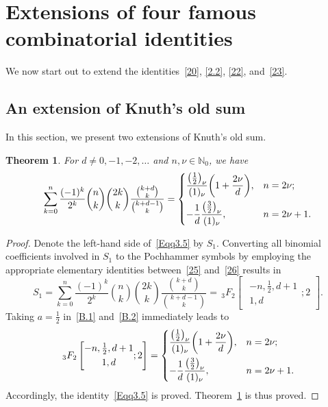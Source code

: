 \documentclass[reqno]{amsart}
\numberwithin{equation}{section}
\theoremstyle{plain}
\newtheorem{thm}{Theorem}[section]
\theoremstyle{remark}
\begin{document}
\section{Extensions of four famous combinatorial identities}\label{sec-four}
We now start out to extend the identities~\eqref{20}, \eqref{2.2}, \eqref{22}, and~\eqref{23}.

\subsection{An extension of Knuth's old sum}\label{sec3}

In this section, we present two extensions of Knuth's old sum.

\begin{thm}\label{thm1}
For $d\neq 0,-1,-2,\dotsc$ and $n,\nu\in\mathbb{N}_0$, we have
\begin{equation}\label{Eqq3.5}
\sum_{k=0}^{n}\frac{(-1)^k}{2^k}\binom{n}{k}\binom{2k}{k}\frac{\binom{k+d}{k}}{\binom{k+d-1}{k}}
=\begin{dcases}
\frac{\bigl(\frac{1}{2}\bigr)_\nu}{(1)_\nu}\biggl(1+\frac{2\nu}{d}\biggr), & n=2\nu;\\
-\frac{1}{d}\frac{\bigl(\frac{3}{2}\bigr)_\nu}{(1)_\nu}, & n=2\nu+1.
\end{dcases}
\end{equation}
\end{thm}

\begin{proof}
Denote the left-hand side of~\eqref{Eqq3.5} by $S_1$.
Converting all binomial coefficients involved in $S_1$ to the Pochhammer symbols by employing the appropriate elementary identities between~\eqref{25} and~\eqref{26} results in
$$
S_1=\sum_{k=0}^{n}\frac{(-1)^k}{2^k}\binom{n}{k}\binom{2k}{k}\frac{\binom{k+d}{k}}{\binom{k+d-1}{k}}
={\,}_3F_2\begin{bmatrix}\begin{gathered}-n, \tfrac12, d+1\\ 1, d \end{gathered};2\end{bmatrix}.
$$
Taking $a=\frac{1}{2}$ in~\eqref{B.1} and~\eqref{B.2} immediately leads to 
\begin{equation*}
{\,}_3F_2\begin{bmatrix}\begin{gathered}-n, \tfrac12, d+1\\ 1, d \end{gathered};2\end{bmatrix}=\begin{dcases}
\frac{\bigl(\frac12\bigr)_\nu}{(1)_\nu}\biggl(1+\frac{2\nu}{d}\biggr), & n=2\nu;\\
-\frac{1}{d}\frac{\bigl(\frac32\bigr)_\nu}{(1)_\nu}, & n=2\nu+1.
\end{dcases}
\end{equation*}
Accordingly, the identity~\eqref{Eqq3.5} is proved. Theorem~\ref{thm1} is thus proved.
\end{proof}
\end{document}
